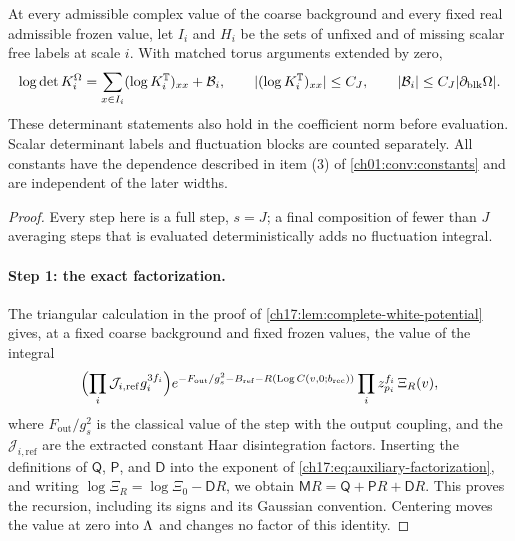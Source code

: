 \begin{theorem}
At every admissible complex value of the coarse background and every fixed real admissible frozen value, let $I_i$ and $H_i$ be the sets of unfixed and of missing scalar free labels at scale $i$. With matched torus arguments extended by zero,
\[
 \log\det K_i^\Omega=\sum_{x\in I_i}(\log K_i^{\mathbb T})_{xx}+\mathcal B_i,\qquad\lvert (\log K_i^{\mathbb T})_{xx}\rvert\le C_J,\qquad\lvert \mathcal B_i\rvert\le C_J\lvert \partial_{\mathrm{blk}}\Omega\rvert.
\]
These determinant statements also hold in the coefficient norm before evaluation. Scalar determinant labels and fluctuation blocks are counted separately. All constants have the dependence described in item (3) of \cref{ch01:conv:constants} and are independent of the later widths.
\end{theorem}

\begin{proof}
Every step here is a full step, $s=J$; a final composition of fewer than $J$ averaging steps that is evaluated deterministically adds no fluctuation integral.

\paragraph{Step 1: the exact factorization.}
The triangular calculation in the proof of \cref{ch17:lem:complete-white-potential} gives, at a fixed coarse background and fixed frozen values, the value of the integral
\begin{equation}\label{ch17:eq:auxiliary-factorization}
 \Bigl(\prod_i\mathcal J_{i,\mathrm{ref}}g_i^{3f_i}\Bigr)e^{-F_{\mathrm{out}}/g_s^2-B_{\mathrm{ref}}-R(\operatorname{Log} C(v,0;b_{\mathrm{rec}}))}\prod_iz_{p_i}^{f_i}\,\Xi_R(v),
\end{equation}
where $F_{\mathrm{out}}/g_s^2$ is the classical value of the step with the output coupling, and the $\mathcal J_{i,\mathrm{ref}}$ are the extracted constant Haar disintegration factors. Inserting the definitions of $\mathsf Q$, $\mathsf P$, and $\mathsf D$ into the exponent of \eqref{ch17:eq:auxiliary-factorization}, and writing $\log\Xi_R=\log\Xi_0-\mathsf DR$, we obtain $\mathsf MR=\mathsf Q+\mathsf PR+\mathsf DR$. This proves the recursion, including its signs and its Gaussian convention. Centering moves the value at zero into $\Lambda$ and changes no factor of this identity.


\end{proof}
